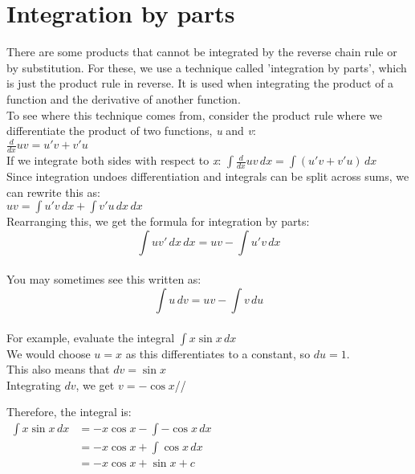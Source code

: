 \documentclass[../main.tex]{subfiles}
\begin{document}
\section{Integration by parts}
There are some products that cannot be integrated by the reverse chain rule or by substitution. For these, we use a technique called 'integration by parts', which is just the product rule in reverse. It is used when integrating the product of a function and the derivative of another function.\\

To see where this technique comes from, consider the product rule where we differentiate the product of two functions, \textit{u} and \textit{v}:\\

\(\frac{d}{dx}uv=u'v + v'u\)\\

If we integrate both sides with respect to \textit{x}:
\(\int \frac{d}{dx}uv\,dx=\int (u'v + v'u)\,dx\)\\

Since integration undoes differentiation and integrals can be split across sums, we can rewrite this as:\\
\(uv=\int u'v\,dx + \int v'u\,dx\,dx\)\\

Rearranging this, we get the formula for integration by parts:\\
\[\int uv'\,dx\,dx = uv - \int u'v\,dx\]\\

You may sometimes see this written as:\\
\[\int u \,dv=uv-\int v \, du\]\\

For example, evaluate the integral \(\int x \sin{x} \, dx\)\\
We would choose \(u=x\) as this differentiates to a constant, so \(du = 1\).\\
This also means that \(dv=\sin{x}\)\\
Integrating \(dv\), we get \(v=-\cos{x}\)//

Therefore, the integral is:\\
$
\!
\begin{aligned}
    \int x \sin{x} \, dx
    &=-x\cos{x}- \int -\cos{x} \, dx\\
    &=-x\cos{x} + \int \cos{x} \, dx\\
    &=-x\cos{x}+\sin{x}+c\\
\end{aligned}
$
\end{document}
